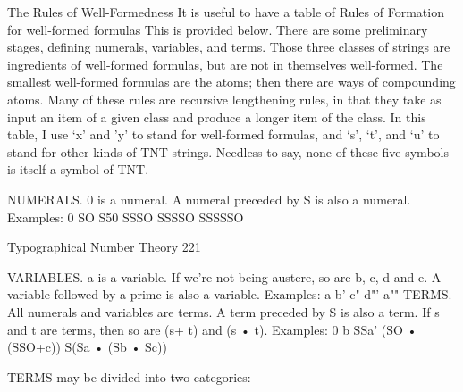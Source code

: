                            The Rules of Well-Formedness
It is useful to have a table of Rules of Formation for well-formed formulas This is
provided below. There are some preliminary stages, defining numerals, variables, and
terms. Those three classes of strings are ingredients of well-formed formulas, but are not
in themselves well-formed. The smallest well-formed formulas are the atoms; then there
are ways of compounding atoms. Many of these rules are recursive lengthening rules, in
that they take as input an item of a given class and produce a longer item of the class. In
this table, I use `x' and 'y' to stand for well-formed formulas, and `s', `t', and `u' to stand
for other kinds of TNT-strings. Needless to say, none of these five symbols is itself a
symbol of TNT.

NUMERALS.
    0 is a numeral.
    A numeral preceded by S is also a numeral.
    Examples: 0 SO S50 SSSO SSSSO SSSSSO




Typographical Number Theory                                                                221

VARIABLES.
         a is a variable. If we're not being austere, so are b, c, d and e. A variable followed
         by a prime is also a variable.
         Examples: a b' c" d"' a""
TERMS.
         All numerals and variables are terms.
         A term preceded by S is also a term.
         If s and t are terms, then so are (s+ t) and (s • t).
         Examples: 0 b SSa' (SO • (SSO+c)) S(Sa • (Sb • Sc))

         TERMS may be divided into two categories:

